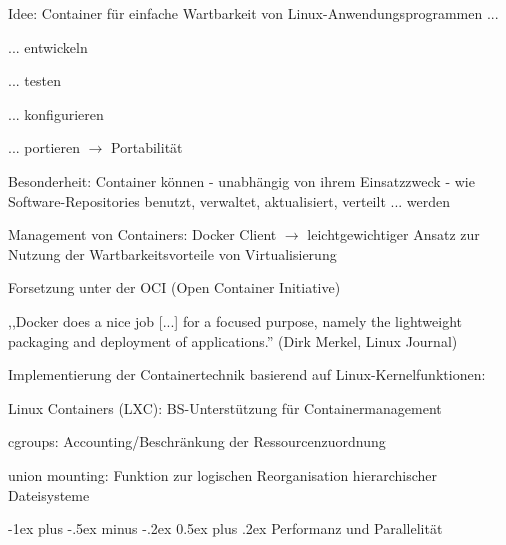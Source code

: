 \documentclass[a4paper]{article}
\makeatletter
\renewcommand{\section}{\@startsection{section}{1}{0mm}%
 {-1ex plus -.5ex minus -.2ex}%
 {0.5ex plus .2ex}%
 {\normalfont\large\bfseries}}
\makeatother
\begin{document}
\begin{multicols}{3}
    \begin{itemize*}
        \item Idee: Container für einfache Wartbarkeit von
        Linux-Anwendungsprogrammen ...
        \begin{itemize*}
            \item ... entwickeln
            \item ... testen
            \item ... konfigurieren
            \item ... portieren $\rightarrow$ Portabilität
        \end{itemize*}
        \item Besonderheit: Container können - unabhängig von ihrem Einsatzzweck -
        wie Software-Repositories benutzt, verwaltet, aktualisiert, verteilt
        ... werden
        \item Management von Containers: Docker Client $\rightarrow$
        leichtgewichtiger Ansatz zur Nutzung der Wartbarkeitsvorteile von
        Virtualisierung
        \item Forsetzung unter der OCI (Open Container Initiative)
        \begin{itemize*}
            \item ,,Docker does a nice job [...] for a focused purpose, namely the lightweight packaging and deployment of applications.'' (Dirk Merkel, Linux Journal)
        \end{itemize*}
        \item Implementierung der Containertechnik basierend auf
        Linux-Kernelfunktionen:
        \begin{itemize*}
            \item Linux Containers (LXC): BS-Unterstützung für Containermanagement
            \item cgroups: Accounting/Beschränkung der Ressourcenzuordnung
            \item union mounting: Funktion zur logischen Reorganisation hierarchischer Dateisysteme
        \end{itemize*}
    \end{itemize*}


    \section{Performanz und
      Parallelität}



\end{multicols}
\end{document}
